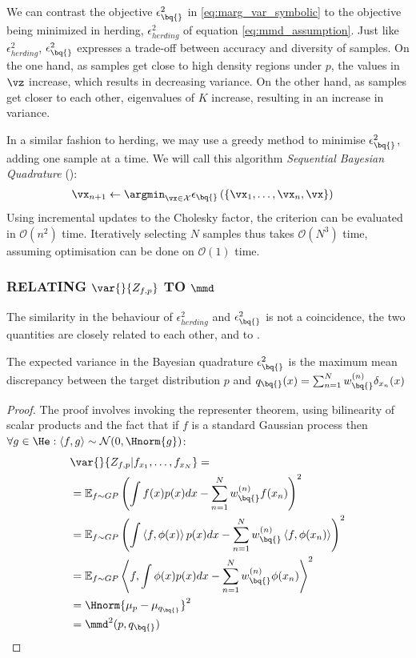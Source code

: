 We can contrast the \bq{} objective $\epsilon^{2}_{\bq{}}$ in \eqref{eq:marg_var_symbolic} to the objective being minimized in herding, $\epsilon^{2}_{herding}$ of equation \eqref{eq:mmd_assumption}. Just like $\epsilon^{2}_{herding}$, $\epsilon^{2}_{\bq{}}$ expresses a trade-off between accuracy and diversity of samples. On the one hand, as samples get close to high density regions under $p$, the values in $\vz$ increase, which results in decreasing variance. On the other hand, as samples get closer to each other, eigenvalues of $K$ increase, resulting in an increase in variance. 

In a similar fashion to herding, we may use a greedy method to minimise $\epsilon^{2}_{\bq{}}$, adding one sample at a time. We will call this algorithm \emph{Sequential Bayesian Quadrature} (\sbq{}):
\begin{align}
\vx_{n+1} &\leftarrow \argmin_{\vx \in \mathcal{X}} \epsilon_{\bq{}}\left(\{\vx_1,\ldots,\vx_{n},\vx\}\right)
\end{align}
Using incremental updates to the Cholesky factor, the criterion can be evaluated in $\mathcal{O}(n^2)$ time. Iteratively selecting $N$ samples thus takes $\mathcal{O}(N^3)$ time, assuming optimisation can be done on $\mathcal{O}(1)$ time.

\subsubsection{RELATING $\var{}{Z_{f,p}}$ TO $\mmd$}

The similarity in the behaviour of $\epsilon^{2}_{herding}$ and $\epsilon^{2}_{\bq{}}$ is not a coincidence, the two quantities are closely related to each other, and to \mmd.
	
\begin{proposition} The expected variance in the Bayesian quadrature $\epsilon^{2}_{\bq{}}$  is the maximum mean discrepancy between the target distribution $p$ and $q_{\bq{}}(x) = \sum_{n=1}^{N}w^{(n)}_{\bq{}}\delta_{x_n}(x)$
\end{proposition}
%
\begin{proof}
The proof involves invoking the representer theorem, using bilinearity of scalar products and the fact that if $f$ is a standard Gaussian process then $\forall g\in\He: \left\langle f,g\right\rangle \sim \mathcal{N}(0,\Hnorm{g})$:
\begin{align}
&\var{}{Z_{f,p}\vert f_{x_1}, \dots, f_{x_N}}=\\
	&= \mathbb{E}_{f\sim GP} \left( \int f(x) p(x) dx - \sum_{n=1}^{N}w^{(n)}_{\bq{}} f(x_n)\right)^2\\
	&= \mathbb{E}_{f\sim GP} \left( \int \left\langle f, \phi (x)\right\rangle p(x) dx - \sum_{n=1}^{N}w^{(n)}_{\bq{}} \left\langle f, \phi (x_n)\right\rangle\right)^2\\
	&= \mathbb{E}_{f\sim GP} \left\langle f ,  \int\phi(x) p(x) dx - \sum_{n=1}^{N}w^{(n)}_{\bq{}}\phi(x_n)\right\rangle^2\\
	&= \Hnorm{\mu_p - \mu_{q_{\bq{}}}}^2\\
	&= \mmd^2(p,q_{\bq{}})
\end{align}
\end{proof}

